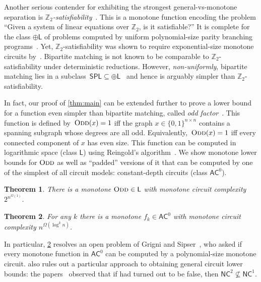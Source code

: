 \documentclass[11pt]{article}
\theoremstyle{plain}
\newtheorem{theorem}{Theorem}
\theoremstyle{definition}
\theoremstyle{remark}
\newcommand{\Odd}{\textsc{Odd}}
\newcommand{\complexityfont}[1]{\mathsf{#1}}
\def\AC           {\complexityfont{AC}}
\def\pL           {\oplus\L}
\def\NC           {\complexityfont{NC}}
\def\SPL          {\complexityfont{SPL}}
\renewcommand{\L} {\complexityfont{L}}
\begin{document}
Another serious contender for exhibiting the strongest general-vs-monotone
separation is \emph{$\mathbb{Z}_2$-satisfiability}~\cite{Goos2019}. This is
a monotone function encoding the problem ``Given a system of linear
equations over $\mathbb{Z}_2$, is it satisfiable?'' It is complete for the class $\pL$ of problems computed by uniform polynomial-size parity branching programs~\cite{Damm1990}. Yet, $\mathbb{Z}_2$-satisfiability was shown to require exponential-size monotone circuits by~\cite{Garg2020,Goos2019}. Bipartite matching is not known to be comparable to $\mathbb{Z}_2$-satisfiability under deterministic reductions. However, \emph{non-uniformly}, bipartite matching lies in a subclass~$\SPL\subseteq\pL$~\cite{Allender1999} and hence is arguably simpler than $\mathbb{Z}_2$-satisfiability.

In fact, our proof of \cref{thm:main} can be extended further to prove a lower bound for a function even
simpler than bipartite matching, called \emph{odd factor}~\cite{Babai1999}. This function is defined
by~$\Odd(x)= 1$ iff the graph $x\in\{0,1\}^{n\times n}$ contains a spanning subgraph whose degrees are
all odd. Equivalently,~$\Odd(x)= 1$ iff every connected component of $x$ has even size. This function can
be computed in logarithmic space (class $\L$) using Reingold's algorithm~\cite{Reingold2008}. We show
monotone lower bounds for $\Odd$ as well as ``padded'' versions of it that can be computed by one of the
simplest of all circuit models: constant-depth circuits (class $\AC^0$).
\begin{theorem}
    \label{thm:l}
    There is a monotone $\Odd\in\L$ with monotone circuit complexity $2^{n^{\Omega(1)}}$.
\end{theorem}

\begin{theorem}
    \label{thm:ac0}
    For any $k$ there is a monotone $f_k\in\AC^0$ with monotone circuit complexity $n^{\Omega(\log^k n)}$.
\end{theorem}

In particular, \cref{thm:ac0} resolves an open problem of Grigni and Sipser~\cite{Grigni1992}, who asked
if every monotone function in $\AC^0$ can be computed by a polynomial-size monotone circuit.
 also rules out a particular approach to obtaining general circuit lower bounds: the papers~\cite{Chen2022,Cavalar2023} observed that if  had turned out to be false, then $\NC^2 \not\subseteq \NC^1$.
\end{document}

